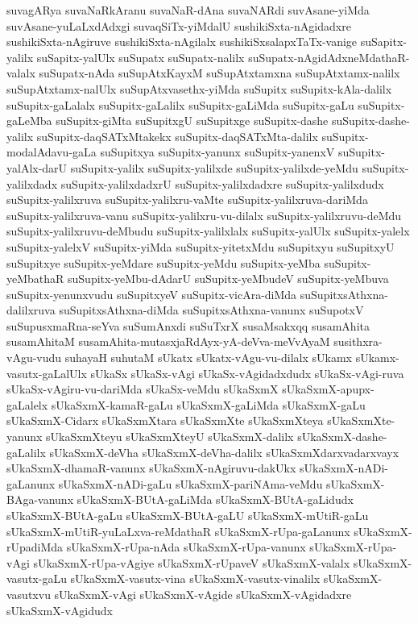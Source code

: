 {suvagARya
suvaNaRkAranu
suvaNaR-dAna
suvaNARdi
suvAsane-yiMda
suvAsane-yuLaLxdAdxgi
suvaqSiTx-yiMdalU
sushikiSxta-nAgidadxre
sushikiSxta-nAgiruve
sushikiSxta-nAgilalx
sushikiSxsalapxTaTx-vanige
suSapitx-yalilx
suSapitx-yalUlx
suSupatx
suSupatx-nalilx
suSupatx-nAgidAdxneMdathaR-valalx
suSupatx-nAda
suSupAtxKayxM
suSupAtxtamxna
suSupAtxtamx-nalilx
suSupAtxtamx-nalUlx
suSupAtxvasethx-yiMda
suSupitx
suSupitx-kAla-dalilx
suSupitx-gaLalalx
suSupitx-gaLalilx
suSupitx-gaLiMda
suSupitx-gaLu
suSupitx-gaLeMba
suSupitx-giMta
suSupitxgU
suSupitxge
suSupitx-dashe
suSupitx-dashe-yalilx
suSupitx-daqSATxMtakekx
suSupitx-daqSATxMta-dalilx
suSupitx-modalAdavu-gaLa
suSupitxya
suSupitx-yanunx
suSupitx-yanenxV
suSupitx-yalAlx-darU
suSupitx-yalilx
suSupitx-yalilxde
suSupitx-yalilxde-yeMdu
suSupitx-yalilxdadx
suSupitx-yalilxdadxrU
suSupitx-yalilxdadxre
suSupitx-yalilxdudx
suSupitx-yalilxruva
suSupitx-yalilxru-vaMte
suSupitx-yalilxruva-dariMda
suSupitx-yalilxruva-vanu
suSupitx-yalilxru-vu-dilalx
suSupitx-yalilxruvu-deMdu
suSupitx-yalilxruvu-deMbudu
suSupitx-yalilxlalx
suSupitx-yalUlx
suSupitx-yalelx
suSupitx-yalelxV
suSupitx-yiMda
suSupitx-yitetxMdu
suSupitxyu
suSupitxyU
suSupitxye
suSupitx-yeMdare
suSupitx-yeMdu
suSupitx-yeMba
suSupitx-yeMbathaR
suSupitx-yeMbu-dAdarU
suSupitx-yeMbudeV
suSupitx-yeMbuva
suSupitx-yenunxvudu
suSupitxyeV
suSupitx-vicAra-diMda
suSupitxsAthxna-dalilxruva
suSupitxsAthxna-diMda
suSupitxsAthxna-vanunx
suSupotxV
suSupusxmaRna-seYva
suSumAnxdi
suSuTxrX
susaMsakxqq
susamAhita
susamAhitaM
susamAhita-mutasxjaRdAyx-yA-deVva-meVvAyaM
susithxra-vAgu-vudu
suhayaH
suhutaM
sUkatx
sUkatx-vAgu-vu-dilalx
sUkamx
sUkamx-vasutx-gaLalUlx
sUkaSx
sUkaSx-vAgi
sUkaSx-vAgidadxdudx
sUkaSx-vAgi-ruva
sUkaSx-vAgiru-vu-dariMda
sUkaSx-veMdu
sUkaSxmX
sUkaSxmX-apupx-gaLalelx
sUkaSxmX-kamaR-gaLu
sUkaSxmX-gaLiMda
sUkaSxmX-gaLu
sUkaSxmX-Cidarx
sUkaSxmXtara
sUkaSxmXte
sUkaSxmXteya
sUkaSxmXte-yanunx
sUkaSxmXteyu
sUkaSxmXteyU
sUkaSxmX-dalilx
sUkaSxmX-dashe-gaLalilx
sUkaSxmX-deVha
sUkaSxmX-deVha-dalilx
sUkaSxmXdarxvadarxvayx
sUkaSxmX-dhamaR-vanunx
sUkaSxmX-nAgiruvu-dakUkx
sUkaSxmX-nADi-gaLanunx
sUkaSxmX-nADi-gaLu
sUkaSxmX-pariNAma-veMdu
sUkaSxmX-BAga-vanunx
sUkaSxmX-BUtA-gaLiMda
sUkaSxmX-BUtA-gaLidudx
sUkaSxmX-BUtA-gaLu
sUkaSxmX-BUtA-gaLU
sUkaSxmX-mUtiR-gaLu
sUkaSxmX-mUtiR-yuLaLxva-reMdathaR
sUkaSxmX-rUpa-gaLanunx
sUkaSxmX-rUpadiMda
sUkaSxmX-rUpa-nAda
sUkaSxmX-rUpa-vanunx
sUkaSxmX-rUpa-vAgi
sUkaSxmX-rUpa-vAgiye
sUkaSxmX-rUpaveV
sUkaSxmX-valalx
sUkaSxmX-vasutx-gaLu
sUkaSxmX-vasutx-vina
sUkaSxmX-vasutx-vinalilx
sUkaSxmX-vasutxvu
sUkaSxmX-vAgi
sUkaSxmX-vAgide
sUkaSxmX-vAgidadxre
sUkaSxmX-vAgidudx
}
